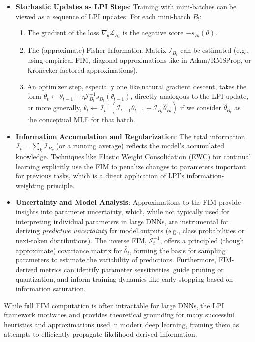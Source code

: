 \documentclass[11pt]{article}
\begin{document}
\begin{itemize}
  \item \textbf{Stochastic Updates as LPI Steps}: Training with mini-batches can be viewed as a sequence of LPI updates. For each mini-batch $B_t$:
  \begin{enumerate}
    \item The gradient of the loss $\nabla_\theta \mathcal{L}_{B_t}$ is the negative score $-s_{B_t}(\theta)$.
    \item The (approximate) Fisher Information Matrix $\mathcal{I}_{B_t}$ can be estimated (e.g., using empirical FIM, diagonal approximations like in Adam/RMSProp, or Kronecker-factored approximations).
    \item An optimizer step, especially one like natural gradient descent, takes the form $\theta_{t} \leftarrow \theta_{t-1} - \eta \mathcal{I}_{B_t}^{-1} s_{B_t}(\theta_{t-1})$, directly analogous to the LPI update, or more generally, $\theta_t \leftarrow \mathcal{I}_t^{-1}(\mathcal{I}_{t-1}\theta_{t-1} + \mathcal{I}_{B_t}\hat\theta_{B_t})$ if we consider $\hat\theta_{B_t}$ as the conceptual MLE for that batch.
  \end{enumerate}
  \item \textbf{Information Accumulation and Regularization}: The total information $\mathcal{I}_t = \sum_k \mathcal{I}_{B_k}$ (or a running average) reflects the model's accumulated knowledge. Techniques like Elastic Weight Consolidation (EWC) \cite{kirkpatrick2017overcoming} for continual learning explicitly use the FIM to penalize changes to parameters important for previous tasks, which is a direct application of LPI's information-weighting principle.
  \item \textbf{Uncertainty and Model Analysis}: Approximations to the FIM provide insights into parameter uncertainty, which, while not typically used for interpreting individual parameters in large DNNs, are instrumental for deriving \textit{predictive uncertainty} for model outputs (e.g., class probabilities or next-token distributions). The inverse FIM, $\mathcal{I}_t^{-1}$, offers a principled (though approximate) covariance matrix for $\hat{\theta}_t$, forming the basis for sampling parameters to estimate the variability of predictions. Furthermore, FIM-derived metrics can identify parameter sensitivities, guide pruning or quantization, and inform training dynamics like early stopping based on information saturation.
\end{itemize}
While full FIM computation is often intractable for large DNNs, the LPI framework motivates and provides theoretical grounding for many successful heuristics and approximations used in modern deep learning, framing them as attempts to efficiently propagate likelihood-derived information.
\end{document}
